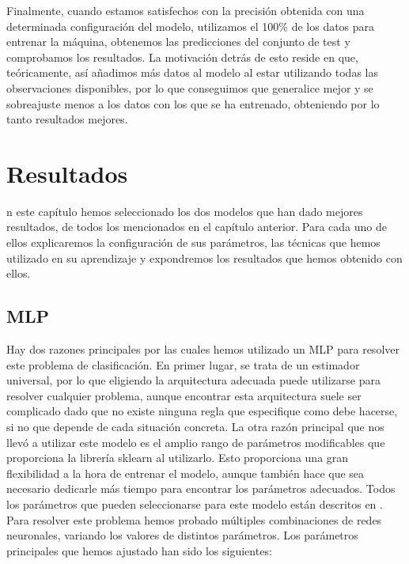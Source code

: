\documentclass[journal,twoside]{JoPhA}
\begin{document}
Finalmente, cuando estamos satisfechos con la precisión obtenida con una determinada configuración del modelo, utilizamos el 100\% de los datos para entrenar la máquina, obtenemos las predicciones del conjunto de test y comprobamos los resultados. La motivación detrás de esto reside en que, teóricamente, así añadimos más datos al modelo al estar utilizando todas las observaciones disponibles, por lo que conseguimos que generalice mejor y se sobreajuste menos a los datos con los que se ha entrenado, obteniendo por lo tanto resultados mejores. \\


\section{Resultados}
n este capítulo hemos seleccionado los dos modelos que han dado mejores resultados, de todos los mencionados en el capítulo anterior. Para cada uno de ellos explicaremos la configuración de sus parámetros, las técnicas que hemos utilizado en su aprendizaje y expondremos los resultados que hemos obtenido con ellos.


\subsection{MLP}
Hay dos razones principales por las cuales hemos utilizado un MLP para resolver este problema de clasificación. En primer lugar, se trata de un estimador universal, por lo que eligiendo la arquitectura adecuada puede utilizarse para resolver cualquier problema, aunque encontrar esta arquitectura suele ser complicado dado que no existe ninguna regla que especifique como debe hacerse, si no que depende de cada situación concreta. La otra razón principal que nos llevó a utilizar este modelo es el amplio rango de parámetros modificables que proporciona la librería sklearn al utilizarlo. Esto proporciona una gran flexibilidad a la hora de entrenar el modelo, aunque también hace que sea necesario dedicarle más tiempo para encontrar los parámetros adecuados. Todos los parámetros que pueden seleccionarse para este modelo están descritos en \cite{mlp}. \\

Para resolver este problema hemos probado múltiples combinaciones de redes neuronales, variando los valores de distintos parámetros. Los parámetros principales que hemos ajustado han sido los siguientes: \\
\end{document}
